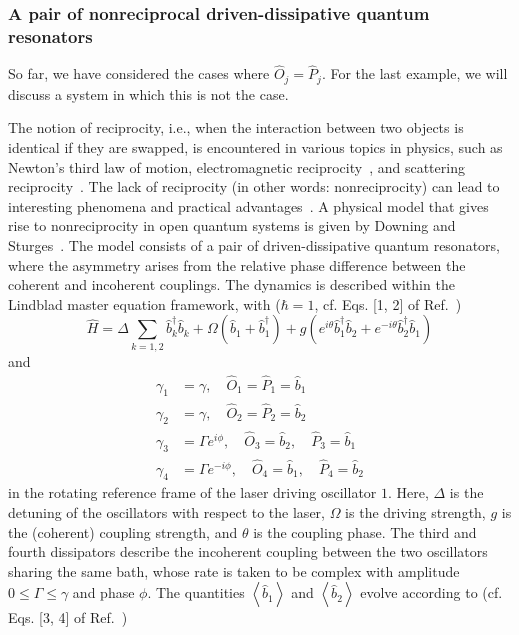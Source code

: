 \documentclass[onecolumn, 12pt, sort&compress]{elsarticle}
\newcounter{bla}
\newcommand{\expval}[1]{\left\langle{#1}\right\rangle}
\newcommand{\bop}{\hat{b}}
\newcommand{\bdag}{\bop^\dagger}
\begin{document}

\subsubsection{A pair of nonreciprocal driven-dissipative quantum resonators}

So far, we have considered the cases where $\hat{O}_j=\hat{P}_j$.  For the last example, we will discuss a system in which this is not the case. 

The notion of reciprocity, i.e., when the interaction between two objects is identical if they are swapped, is encountered in various topics in physics, such as Newton's third law of motion, electromagnetic reciprocity~\cite{Caloz2018}, and scattering reciprocity~\cite{Dek2012}. The lack of reciprocity (in other words: nonreciprocity) can lead to interesting phenomena and practical advantages~\cite{Downing2022}. A physical model that gives rise to nonreciprocity in open quantum systems is given by Downing and Sturges~\cite{Downing2022}. The model consists of a pair of driven-dissipative quantum resonators, where the asymmetry arises from the relative phase difference between the coherent and incoherent couplings. The dynamics is described within the Lindblad master equation framework, with ($\hbar=1$, cf. Eqs. [1, 2] of Ref.~\cite{Downing2022})
\begin{equation}
    \hat{H} = \Delta\sum_{k=1,2}\bdag_k\bop_k + \Omega\left(\bop_1+\bdag_1\right) + g\left(e^{i\theta}\bdag_1\bop_2 + e^{-i\theta}\bdag_2\bop_1\right) 
\end{equation}
and
\begin{subequations}
\begin{align}
    \gamma_1 &= \gamma, \quad \hat{O}_1=\hat{P}_1=\bop_1
    \\
    \gamma_2 &= \gamma, \quad \hat{O}_2=\hat{P}_2=\bop_2
    \\
    \gamma_3 &= \Gamma e^{i\phi}, \quad \hat{O}_3=\bop_2,\quad \hat{P}_3=\bop_1
    \\
    \gamma_4 &= \Gamma e^{-i\phi}, \quad \hat{O}_4 = \bop_1,\quad \hat{P}_4 = \bop_2
\end{align}
\end{subequations}
in the rotating reference frame of the laser driving oscillator $1$. Here, $\Delta$ is the detuning of the oscillators with respect to the laser, $\Omega$ is the driving strength, $g$ is the (coherent) coupling strength, and $\theta$ is the coupling phase.  The third and fourth dissipators describe the incoherent coupling between the two oscillators sharing the same bath, whose rate is taken to be complex with amplitude $0\leq \Gamma\leq \gamma$ and phase $\phi$.  The quantities $\expval{\bop_1}$ and $\expval{\bop_2}$ evolve according to (cf. Eqs. [3, 4] of Ref.~\cite{Downing2022})
\end{document}
